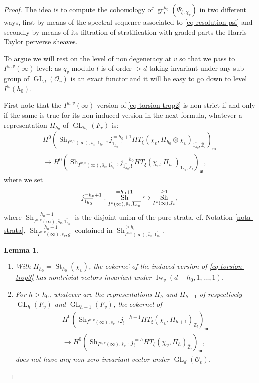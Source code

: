 \documentclass[11pt]{article}
\newcommand{\cf}{cf.\xspace}
\newcommand{\skpt}{\smallskip}
\newenvironment{enumeratei}
{\bgroup\def\theenumi{\roman{enumi}}\def\theenumii{\arabic{enumii}}\begin{enumerate}}
{\end{enumerate}\egroup}
\def\hto{\mathrel{\lhook\joinrel\to}}
\DeclareMathOperator{\GL}{GL}
\theoremstyle{plain}
\newtheorem{lemma}[equation]{Lemma}
\theoremstyle{definition}
\numberwithin{equation}{subsection}
\newcommand\Zm{{\mathbb Z}}
\newcommand\OC{{\mathcal O}}
\DeclareMathOperator{\sh}{Sh}
\DeclareMathOperator{\Iw}{Iw}
\DeclareMathOperator{\st}{St}
\DeclareMathOperator{\gr}{gr}
\let \oo=\infty
\begin{document}
\begin{proof}
The idea is to compute the cohomology of $\gr^{h_0}_{!}(\Psi_{\xi,\chi_v})$
in two different ways, first by means of the spectral sequence associated to
\eqref{eq-resolution-psi} and secondly by means of its filtration of stratification with graded parts the Harris-Taylor perverse sheaves.

To argue we will rest on the level of non degeneracy at $v$ so that we pass to
$I^{w,v}(\oo)$-level: as $q_v$ modulo $l$ is of order $>d$ taking
invariant under any sub-group of $\GL_d(\OC_v)$ is an exact functor and it
will be easy to go down to level $I^w(h_0)$.

First note that the $I^{w,v}(\oo)$-version of
\eqref{eq-torsion-trop2} is non strict
if and only if the same is true for its non induced version in the next formula,
whatever a representation $\Pi_{h_0}$ of $\GL_{h_0}(F_v)$ is:\vspace*{-3pt}
\begin{multline} \label{eq-torsion-trop3}
H^{0}(\sh_{I^{w,v}(\oo),\bar s_v,\overline{1_{h_0}}},j^{=h_0+1}_{\overline{1_{h_0}},!} HT_{\xi}
(\chi_v,\Pi_{h_0} \otimes \chi_v)_{\overline{1_{h_0}},\overline \Zm_l})_{\mathfrak m} \\
\to H^0(\sh_{I^{w,v}(\oo),\bar s_v,\overline{1_{h_0}}},j^{=h_0}_{\overline{1_{h_0}},!}
HT_{\xi}(\chi_v,\Pi_{h_0})_{\overline{1_{h_0}},\overline \Zm_l})_{\mathfrak m},
\end{multline}
where we set
\[
j^{=h_0+1}_{\overline{1_{h_0}}}:
\sh^{=h_0+1}_{I^v(\oo),\bar s_v,\overline{1_{h_0}}}
\hto \sh^{\geq 1}_{I^v(\oo),\bar s_v},
\]
where $\sh^{=h_0+1}_{I^{w,v}(\oo),\bar s_v,\overline{1_{h_0}}}$ is the
disjoint union of the pure strata, \cf Notation \ref{nota-strata},
$\sh^{=h_0+1}_{I^{w,v}(\oo),\bar s_v,g}$
contained in $\sh^{\geq h_0}_{I^{w,v}(\oo),\bar s_v,\overline{1_{h_0}}}$.

\skpt
\begin{lemma} \label{lem-facts0}
\begin{enumeratei}
\item\label{lem-facts0i} With $\Pi_{h_0}=\st_{h_0}(\chi_v)$, the cokernel of the induced version of
\eqref{eq-torsion-trop3} has nontrivial vectors invariant
under $\Iw_v(d-h_0,1,\dots,1)$.

\item\label{lem-facts0ii} For $h > h_0$, whatever are the representations $\Pi_h$ and
$\Pi_{h+1}$ of respectively $\GL_h(F_v)$ and $\GL_{h+1}(F_v)$, the cokernel of
\begin{multline} \label{eq-torsion-trop-h}
H^{0}(\sh_{I^{w,v}(\oo),\bar s_v},j^{=h+1}_!
HT_\xi(\chi_v,\Pi_{h+1})_{\overline \Zm_l})_{\mathfrak m} \\
\to H^0(\sh_{I^{w,v}(\oo),\bar s_v},j^{=h}_!
HT_\xi(\chi_v,\Pi_h)_{\overline \Zm_l})_{\mathfrak m},
\end{multline}
does not have any non zero invariant vector under $\GL_d(\OC_v)$.


\end{enumeratei}
\end{lemma}
\end{proof}
\end{document}
